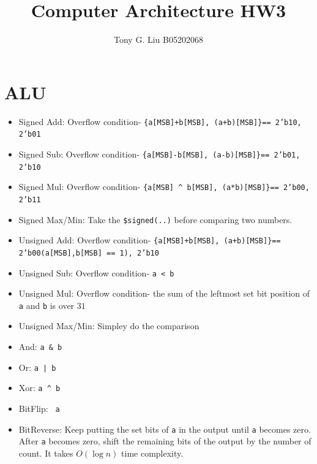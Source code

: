 \documentclass[11pt,a4paper]{article}
\title{Computer Architecture HW3}
\author{Tony G. Liu B05202068}
\begin{document}
    \maketitle
    
\section{ALU}%
\label{sec:ALU}

\begin{itemize}
    \item Signed Add: Overflow condition- \texttt{\{a[MSB]+b[MSB], (a+b)[MSB]\}==  2'b10, 2'b01 }\n
        
    \item Signed Sub: Overflow condition- \texttt{\{a[MSB]-b[MSB], (a-b)[MSB]\}==  2'b01, 2'b10 }\n

    \item Signed Mul: Overflow condition- \texttt{\{a[MSB] \string^ b[MSB], (a*b)[MSB]\}==  2'b00, 2'b11}\n

    \item Signed Max/Min: Take the \texttt{\$signed(..)} before comparing two numbers.\n 

    \item Unsigned Add: Overflow condition- \texttt{\{a[MSB]+b[MSB], (a+b)[MSB]\}==  2'b00(a[MSB],b[MSB] == 1), 2'b10 }\n


    \item Unsigned Sub:   Overflow condition- \texttt{a < b}
    \item Unsigned Mul: Overflow condition- the sum of the leftmost set bit position of \texttt{a} and \texttt{b} is over $31$

    \item Unsigned Max/Min: Simpley do the comparison\n

    \item And:  \texttt{a \& b}

    \item Or:   \texttt{a | b}

    \item Xor:  \texttt{a \string^ b}

    \item BitFlip: \texttt{\string~a }

    \item BitReverse: Keep putting the set bits of \texttt{a} in the output until \texttt{a} becomes zero. After \texttt{a} becomes zero, shift the remaining bits of the output by the number of count. It takes $O(\log n)$ time complexity.  
\end{itemize}
\end{document}
